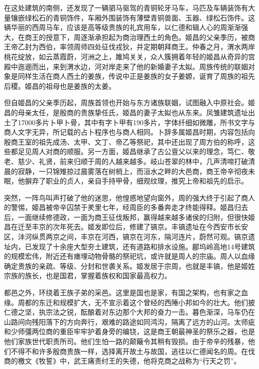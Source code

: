 在这处建筑的南侧，还发现了一辆驷马驱驾的青铜轮牙马车，马匹及车辆装饰有大量镶嵌绿松石的青铜饰件，车厢外围装饰有薄壁青铜兽面、玉器、绿松石饰件。这辆华丽的西周马车，应该是高等级贵族的礼宾用车，以仁德和辑人心的周渐渐强大，在商王的授意下，周逐渐承担起为商治理西土的角色。姬昌的父亲季历，被商王帝乙封为西伯，率领周师四处征伐戎狄，并定期朝拜商王。仲春之月，渭水两岸桃花绽放，如云蒸霞蔚，河洲之上，雎鸠关关，众人簇拥着年轻的姬昌从奇异的宫殿中迤逦而出，来到渭水边，河对岸走来了他的新婚妻子太姒。周族传统的联姻对象是同样生活在商人西土的姜族，传说中正是姜族的女子姜嫄，诞育了周族的祖先后稷。姬昌的祖母也是姜族的太姜。

但自姬昌的父亲季历起，周族首领也开始与东方诸族联姻，试图融入中原社会。姬昌的母亲太任，是殷商的贵族挚任氏，姬昌的妻子太姒也从东来。凤雏建筑遗址出土了17000多片卜甲卜骨，其中有字卜甲有190多片，字体纤细如微雕，所书文字与商人文字无异，所记载的占卜程序也与商人相同。卜辞多属姬昌时期，内容包括向殷商王室的祖先成汤、太甲、文丁、帝乙等祭祀，其中还出现了周方伯的称呼，这些都足见周人对商的顺服。另一方面，姬昌继承了古公亶父以来的理念，笃仁、敬老、慈少、礼贤，前来归顺于周的人越来越多。岐山苍翠的林中，几声清啼打破清晨的寂静，一只锦雉掠过晨雾落在树梢上，而洹水之畔的大邑商，商王帝辛彻夜未眠，他摒弃了职业的贞人，亲自手持甲骨，细观纹理，推究上帝和祖先的启示。

突然，一阵鸟叫声打破了他的迷思，他惶惑地望向窗外，周的强大终于引起了商人的警惕，姬昌被帝辛囚禁于羑里七年，经周臣的多番奔走才终能得释。姬昌归去后，一面继续修德政，一面为商王征伐叛邦，赢得越来越多诸侯的归附，但很快姬昌在迁至丰京的次年死去。姬发即位后，修建了镐京。丰镐遗址在今西安市长安区，沣河纵贯两京之间，丰京在河西，镐京在河东，隔河连片，蔚然可观。镐京遗址内，已发现了十余座大型夯土建筑，还有道路和排水设施。郿坞岭高地14号建筑的规模宏伟，附近还有瘗埋动物骨骼的祭祀坑，或许就是周人的宗庙。周人以血缘确定贵族的亲疏、等级、分封和世袭关系。姬发居于宗周，也就是丰镐，他是姬姓宗族的族长，也是国君，掌握着族权和国家最高权力。

都邑之外，环绕着王族子弟的采邑。这里是国也是家，有国之架构，也有家之血缘。周都的东迁和规模扩大，无不宣示着这个曾经的西陲小邦如今的壮大。他们披仁德之坚，执宗法之锐，酝酿着对东边那个大邦的奋力一击。暮色渐深，马车仍在山路间向残阳落下的方向奔行，艰难的路途如同鸿沟，隔离了远方的山河。太师疵和少师彊两位商的重臣牢牢护着身旁的编铙，这是商王朝最神圣的祭乐之器，也是他们家族世代职责所司。他们生怕一路的颠簸令其稍有毁损。由于帝辛的残暴，他们不得不和许多殷商贵族一样，选择离开故土与故国，逃往以仁德闻名的周。在伐商的檄文《牧誓》中，武王痛责纣王的失德，他将克商之战称为“行天之罚”。

